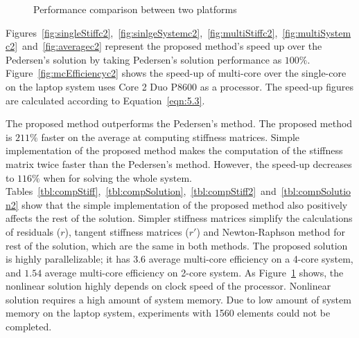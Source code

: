 \begin{figure}
\centerline{}
\caption{Performance comparison between two platforms}
\label{fig:perfCompSystem}
\end{figure}

\clearpage
Figures~\ref{fig:singleStiffc2},~\ref{fig:sinlgeSystemc2},~\ref{fig:multiStiffc2},~\ref{fig:multiSystemc2}~and~\ref{fig:averagec2} represent the proposed method's speed up over the Pedersen's solution by taking Pedersen's solution performance as $100\%$. Figure~\ref{fig:mcEfficiencyc2} shows the speed-up of multi-core over the single-core on the laptop system uses Core 2 Duo P8600 as a processor. The speed-up figures are calculated according to Equation~\ref{eqn:5.3}.

The proposed method outperforms the Pedersen's method. The proposed method is $211\%$ faster on the average at computing stiffness matrices. Simple implementation of the proposed method makes the computation of the stiffness matrix twice faster than the Pedersen's method. However, the speed-up decreases to $116\%$ when for solving the whole system. Tables~\ref{tbl:compStiff},~\ref{tbl:compSolution},~\ref{tbl:compStiff2}~and~\ref{tbl:compSolution2} show that the simple implementation of the proposed method also positively affects the rest of the solution. Simpler stiffness matrices simplify the calculations of residuals ($r$), tangent stiffness matrices ($r'$) and Newton-Raphson method for rest of the solution, which are the same in both methods. The proposed solution is highly parallelizable; it has $3.6$ average multi-core efficiency on a 4-core system, and $1.54$ average multi-core efficiency on 2-core system. As Figure~\ref{fig:perfCompSystem} shows, the nonlinear solution highly depends on clock speed of the processor. Nonlinear solution requires a high amount of system memory. Due to low amount of system memory on the laptop system, experiments with 1560 elements could not be completed.


